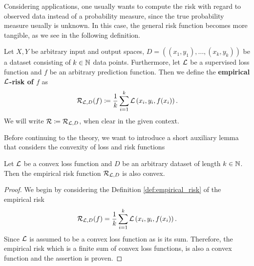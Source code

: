 Considering applications, one usually wants to compute the risk with regard to observed data instead of a probability measure, since the true probability measure usually is unknown. In this case, the general risk function becomes more tangible, as we see in the following definition.


\begin{definition}\label{def:empirical_risk}
Let $X, Y$ be arbitrary input and output spaces, $D = \left((x_1,y_1), \ldots, (x_k,y_k)\right)$ be a dataset consisting of $k\in\operatorname{\mathbb{N}}$ data points. Furthermore, let $\operatorname{\mathcal{L}}$ be a supervised loss function and $f$ be an arbitrary prediction function. Then we define the \textbf{empirical $\operatorname{\mathcal{L}}$-risk of $f$} as
\begin{align*}
\operatorname{\mathcal{R}}_{\operatorname{\mathcal{L}}, D} (f) \coloneqq \frac{1}{k} \sum_{i=1}^{k} \operatorname{\mathcal{L}}\left(x_i, y_i, f(x_i)\right).
\end{align*}
We will write $\operatorname{\mathcal{R}} \coloneqq \operatorname{\mathcal{R}}_{\operatorname{\mathcal{L}}, D}$, when clear in the given context.
\end{definition}


Before continuing to the theory, we want to introduce a short auxiliary lemma that considers the convexity of loss and risk functions

\begin{lemma}\label{lemma:convex_risk}
Let $\operatorname{\mathcal{L}}$ be a convex loss function and $D$ be an arbitrary dataset of length $k\in\operatorname{\mathbb{N}}$.\\
Then the empirical risk function $\operatorname{\mathcal{R}}_{\operatorname{\mathcal{L}}, D}$ is also convex.
\end{lemma}

\begin{proof}
We begin by considering the Definition \ref{def:empirical_risk} of the empirical risk
\begin{align*}
\operatorname{\mathcal{R}}_{\operatorname{\mathcal{L}}, D} (f) = \frac{1}{k} \sum_{i=1}^{k} \operatorname{\mathcal{L}}\left(x_i, y_i, f(x_i)\right).
\end{align*}
Since $\operatorname{\mathcal{L}}$ is assumed to be a convex loss function as is its sum. Therefore, the empirical risk which is a finite sum of convex loss functions, is also a convex function and the assertion is proven.
\end{proof}


